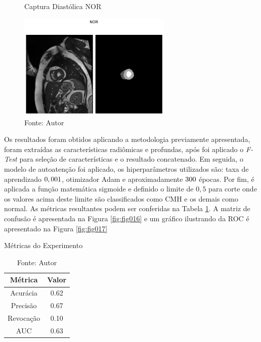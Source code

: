 \begin{figure}[h!]
    \centering
    \caption{Captura Diastólica NOR}
    \includegraphics[width=0.65\textwidth]{figures/fig020.png}
    \caption*{Fonte: Autor}
    \label{fig:fig020}
\end{figure}

Os resultados foram obtidos aplicando a metodologia previamente apresentada, foram extraídas as características radiômicas e profundas, após foi aplicado o \textit{F-Test} para seleção de características e o resultado concatenado. Em seguida, o modelo de autoatenção foi aplicado, os hiperparâmetros utilizados são: taxa de aprendizado $0,001$, otimizador \gls{Adam} e aproximadamente $300$ épocas. Por fim, é aplicada a função matemática sigmoide e definido o limite de $0,5$ para corte onde os valores acima deste limite são classificados como \gls{CMH} e os demais como normal. As métricas resultantes podem ser conferidas na Tabela \ref{tab:metrics}. A matriz de confusão é apresentada na Figura \ref{fig:fig016} e um gráfico ilustrando da \gls{ROC} é apresentado na Figura \ref{fig:fig017}

\begin{table}[h!]
    \centering
    \caption{Métricas do Experimento}
    \renewcommand{\arraystretch}{1} %
    \begin{tabular}{|c|c|}
    \hline 
          \textbf{Métrica} & \textbf{Valor} \\ 
    \hline 
        Acurácia & 0.62 \\ 
    \hline 
        Precisão & 0.67 \\ 
    \hline 
        Revocação & 0.10 \\ 
    \hline 
        AUC & 0.63 \\ 
    \hline 
    \end{tabular} 
    \caption*{Fonte: Autor}
    \label{tab:metrics}
\end{table}

